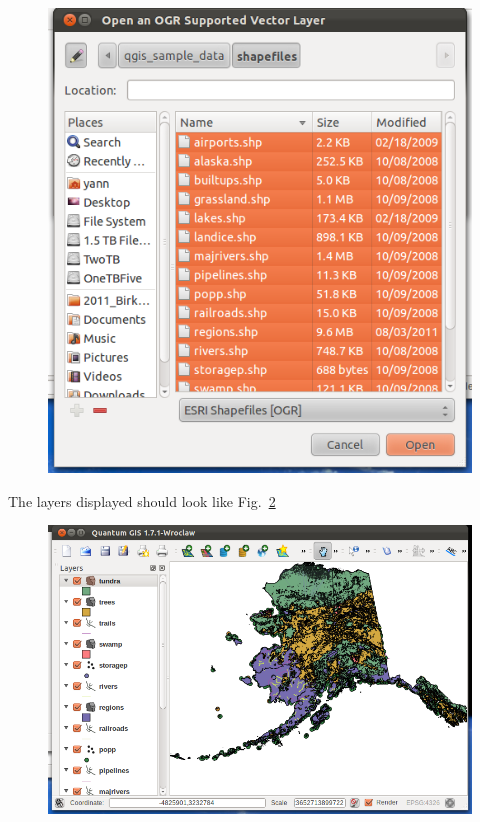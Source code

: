 \begin{figure}[htbp]
   \centering
   \includegraphics[scale=0.28]{qgis002.png}
   \caption{}
   \label{fig:qgis002}
\end{figure}

The layers displayed should look like Fig.~\ref{fig:qgis003}

\begin{figure}[htbp]
   \centering
   \includegraphics[scale=0.22]{qgis003.png}
   \caption{}
   \label{fig:qgis003}
\end{figure}

